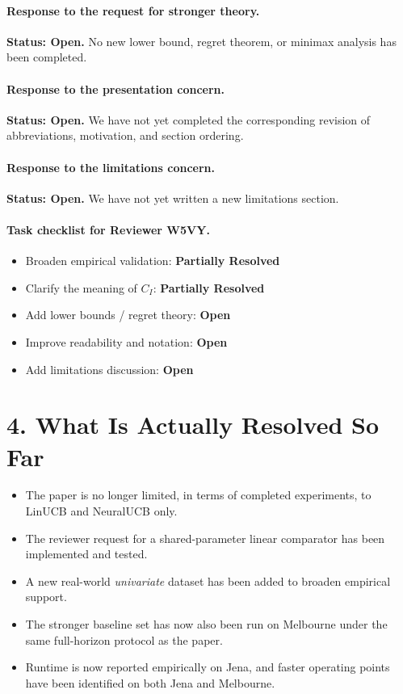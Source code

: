 \documentclass[11pt]{article}
\newcommand{\partialresolved}{\textbf{Partially Resolved}}
\newcommand{\openissue}{\textbf{Open}}
\begin{document}
\paragraph{Response to the request for stronger theory.}
\textbf{Status: \openissue.}
No new lower bound, regret theorem, or minimax analysis has been completed.

\paragraph{Response to the presentation concern.}
\textbf{Status: \openissue.}
We have not yet completed the corresponding revision of abbreviations, motivation, and section ordering.

\paragraph{Response to the limitations concern.}
\textbf{Status: \openissue.}
We have not yet written a new limitations section.

\paragraph{Task checklist for Reviewer W5VY.}
\begin{itemize}[leftmargin=1.5em]
    \item Broaden empirical validation: \partialresolved
    \item Clarify the meaning of $C_I$: \partialresolved
    \item Add lower bounds / regret theory: \openissue
    \item Improve readability and notation: \openissue
    \item Add limitations discussion: \openissue
\end{itemize}

\section*{4. What Is Actually Resolved So Far}

\begin{itemize}[leftmargin=1.5em]
    \item The paper is no longer limited, in terms of completed experiments, to LinUCB and NeuralUCB only.
    \item The reviewer request for a shared-parameter linear comparator has been implemented and tested.
    \item A new real-world \emph{univariate} dataset has been added to broaden empirical support.
    \item The stronger baseline set has now also been run on Melbourne under the same full-horizon protocol as the paper.
    \item Runtime is now reported empirically on Jena, and faster operating points have been identified on both Jena and Melbourne.
\end{itemize}
\end{document}
